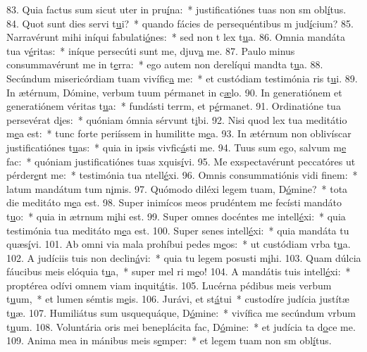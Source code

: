 83. Quia factus sum sicut uter in pru\uline{í}na:~* justificatiónes tuas non sm obl\uline{í}tus.
84. Quot sunt dies servi t\uline{u}i?~* quando fácies de persequéntibus m jud\uline{í}cium?
85. Narravérunt mihi iníqui fabulati\uline{ó}nes:~* sed non t lex t\uline{u}a.
86. Omnia mandáta tua v\uline{é}ritas:~* iníque persecúti sunt me, djuv\uline{a} me.
87. Paulo minus consummavérunt me in t\uline{e}rra:~* ego autem non derelíqui mandta t\uline{u}a.
88. Secúndum misericórdiam tuam vivífic\uline{a} me:~* et custódiam testimónia ris t\uline{u}i.
89. In ætérnum, Dómine, verbum tuum pérmanet in c\uline{æ}lo.
90. In generatiónem et generatiónem véritas t\uline{u}a:~* fundásti terrm, et p\uline{é}rmanet.
91. Ordinatióne tua persevérat d\uline{i}es:~* quóniam ómnia sérvunt t\uline{i}bi.
92. Nisi quod lex tua meditátio m\uline{e}a est:~* tunc forte periíssem in humilitte m\uline{e}a.
93. In ætérnum non oblivíscar justificatiónes t\uline{u}as:~* quia in ipsis vivfic\uline{á}sti me.
94. Tuus sum ego, salvum m\uline{e} fac:~* quóniam justificatiónes tuas xquis\uline{í}vi.
95. Me exspectavérunt peccatóres ut pérder\uline{e}nt me:~* testimónia tua ntell\uline{é}xi.
96. Omnis consummatiónis vidi f\uline{i}nem:~* latum mandátum tum n\uline{i}mis.
97. Quómodo diléxi legem tuam, D\uline{ó}mine?~* tota die meditáto m\uline{e}a est.
98. Super inimícos meos prudéntem me fecísti mandáto t\uline{u}o:~* quia in ætrnum m\uline{i}hi est.
99. Super omnes docéntes me intell\uline{é}xi:~* quia testimónia tua meditáto m\uline{e}a est.
100. Super senes intell\uline{é}xi:~* quia mandáta tu quæs\uline{í}vi.
101. Ab omni via mala prohíbui pedes m\uline{e}os:~* ut custódiam vrba t\uline{u}a.
102. A judíciis tuis non declin\uline{á}vi:~* quia tu legem posusti m\uline{i}hi.
103. Quam dúlcia fáucibus meis elóquia t\uline{u}a,~* super mel ri m\uline{e}o!
104. A mandátis tuis intell\uline{é}xi:~* proptérea odívi omnem viam inquit\uline{á}tis.
105. Lucérna pédibus meis verbum t\uline{u}um,~* et lumen sémtis m\uline{e}is.
106. Jurávi, et st\uline{á}tui~* custodíre judícia justítæ t\uline{u}æ.
107. Humiliátus sum usquequáque, D\uline{ó}mine:~* vivífica me secúndum vrbum t\uline{u}um.
108. Voluntária oris mei beneplácita fac, D\uline{ó}mine:~* et judícia ta d\uline{o}ce me.
109. Anima mea in mánibus meis s\uline{e}mper:~* et legem tuam non sm obl\uline{í}tus.
